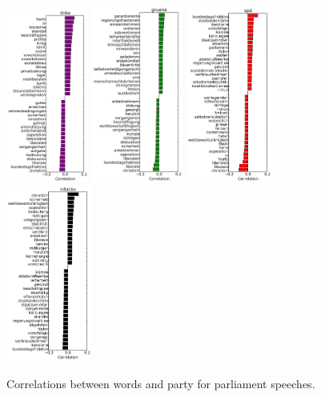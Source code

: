 \documentclass[runningheads,a4paper]{llncs}
\begin{document}
\begin{figure}
\begin{center}
\includegraphics[width=2.7cm]{images/party_word_correlations-linke-17.pdf} 
\includegraphics[width=3cm]{images/party_word_correlations-gruene-17.pdf} 
\includegraphics[width=2.8cm]{images/party_word_correlations-spd-17.pdf} 
\includegraphics[width=2.8cm]{images/party_word_correlations-cducsu-17.pdf}
%
\end{center}
\caption{
\label{fig:party_word_correlations}
Correlations between words and party for parliament speeches. }
\end{figure}
\end{document}
